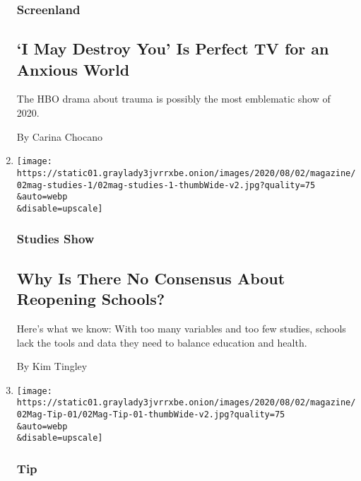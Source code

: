 \begin{enumerate}
  \hypertarget{screenland}{%
  \subsubsection{Screenland}\label{screenland}}

  \hypertarget{i-may-destroy-you-is-perfect-tv-for-an-anxious-world}{%
  \subsection{`I May Destroy You' Is Perfect TV for an Anxious
  World}\label{i-may-destroy-you-is-perfect-tv-for-an-anxious-world}}

  The HBO drama about trauma is possibly the most emblematic show of
  2020.

  By Carina Chocano
\item
  \href{/2020/07/29/magazine/schools-reopening-covid.html}{}

  \texttt{[image: https://static01.graylady3jvrrxbe.onion/images/2020/08/02/magazine/02mag-studies-1/02mag-studies-1-thumbWide-v2.jpg?quality=75\\\&auto=webp\\\&disable=upscale]}

  \hypertarget{studies-show}{%
  \subsubsection{Studies Show}\label{studies-show}}

  \hypertarget{why-is-there-no-consensus-about-reopening-schools}{%
  \subsection{Why Is There No Consensus About Reopening
  Schools?}\label{why-is-there-no-consensus-about-reopening-schools}}

  Here's what we know: With too many variables and too few studies,
  schools lack the tools and data they need to balance education and
  health.

  By Kim Tingley
\item
  \href{/2020/07/28/magazine/how-to-stop-biting-your-nails.html}{}

  \texttt{[image: https://static01.graylady3jvrrxbe.onion/images/2020/08/02/magazine/02Mag-Tip-01/02Mag-Tip-01-thumbWide-v2.jpg?quality=75\\\&auto=webp\\\&disable=upscale]}

  \hypertarget{tip-}{%
  \subsubsection{Tip }\label{tip-}}


\end{enumerate}
